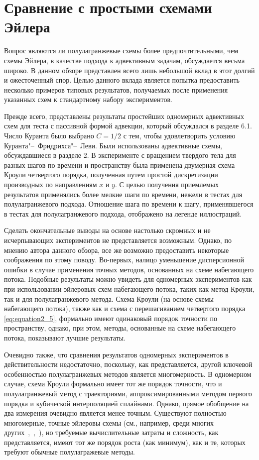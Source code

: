 \section*{Сравнение с простыми схемами Эйлера} \label{sect6_3}
Вопрос являются ли полулагранжевые схемы более предпочтительными, чем схемы Эйлера, в качестве подхода к адвективным задачам, обсуждается весьма широко. В данном обзоре представлен всего лишь небольшой вклад в этот долгий и ожесточенный спор. Целью данного вклада является попытка предоставить несколько примеров типовых результатов, получаемых после применения указанных схем к стандартному набору экспериментов.

Прежде всего, представлены результаты простейших одномерных адвективных схем для теста с пассивной формой адвекции, который обсуждался в разделе 6.1. Число Куранта было выбрано $C=1/2$  с тем, чтобы удовлетворить условию Куранта"--~Фридрихса"--~Леви. Были использованы адвективные схемы, обсуждавшиеся в разделе 2. В эксперименте с вращением твердого тела для разных шагов по времени и пространству была применена двумерная схема Кроули четвертого порядка, полученная путем простой дискретизации производных по направлениям $x$ и $y$. С целью получения приемлемых результатов применялись более мелкие шаги по времени, нежели в тестах для полулагранжевого подхода. Отношение шага по времени к шагу, применявшегося в тестах для полулагранжевого подхода, отображено на легенде иллюстраций.
%

Сделать окончательные выводы на основе настолько скромных и не исчерпывающих экспериментов не представляется возможным. Однако, по мнению автора данного обзора, все же возможно предоставить некоторые соображения по этому поводу. Во-первых, налицо уменьшение дисперсионной ошибки в случае применения точных методов, основанных на схеме набегающего потока. Подобные результаты можно увидеть для одномерных экспериментов как при использовании эйлеровых схем набегающего потока, таких как метод Кроули, так и для полулагранжевого метода. Схема Кроули (на основе схемы набегающего потока), также как и схема с перешагиванием четвертого порядка \eqref{eq:equation2_5}, формально имеют одинаковый порядок точности по пространству, однако, при этом, методы, основанные на схеме набегающего потока, показывают лучшие результаты.

Очевидно также, что сравнения результатов одномерных экспериментов в действительности недостаточно, поскольку, как представляется, другой ключевой особенностью полулагранжевых методов является многомерность. В одномерном случае, схема Кроули формально имеет тот же порядок точности, что и полулагранжевый метод с траекториями, аппроксимированными методом первого порядка и кубической интерполяцией сплайнами. Однако, прямое обобщение на два измерения очевидно является менее точным. Существуют полностью многомерные, точные эйлеровы схемы (см., например, среди многих других~\cite{A32},~\cite{A64},~\cite{A66}), но требуемые вычислительные затраты и сложность, как представляется, имеют тот же порядок роста (как минимум), как и те, которых требуют обычные полулагражевые методы.

